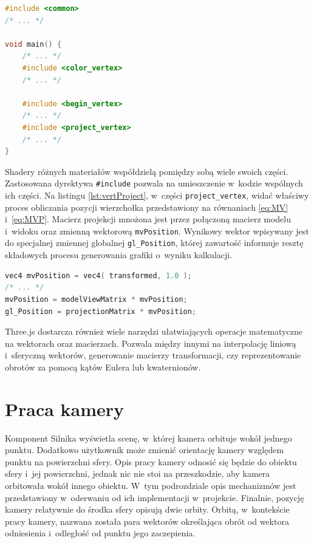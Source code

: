 \begin{lstlisting}[language=C++, label={lst:matVert}, caption={
    Fragmenty vertex shadera materiału \texttt{MeshBasicMaterial}}
]
#include <common>
/* ... */

void main() {
    /* ... */
	#include <color_vertex>
    /* ... */

	#include <begin_vertex>
	/* ... */
	#include <project_vertex>
	/* ... */
}
\end{lstlisting}

Shadery różnych materiałów współdzielą pomiędzy sobą wiele swoich części. Zastosowana dyrektywa \texttt{\#include} pozwala na umieszczenie w~kodzie wspólnych ich części. Na listingu \ref{lst:vertProject}, w~części \texttt{project\_vertex}, widać właściwy proces obliczania pozycji wierzchołka przedstawiony na równaniach \ref{eq:MV} i~\ref{eq:MVP}. Macierz projekcji mnożona jest przez połączoną macierz modelu i~widoku oraz zmienną wektorową \texttt{mvPosition}. Wynikowy wektor wpisywany jest do specjalnej zmiennej globalnej \texttt{gl\_Position}, której zawartość informuje resztę składowych procesu generowania grafiki o~wyniku kalkulacji. 

\begin{lstlisting}[language=C++, label={lst:vertProject}, caption={
    Fragmenty części \texttt{project\_vertex} vertex shadera}
]
vec4 mvPosition = vec4( transformed, 1.0 );
/* ... */
mvPosition = modelViewMatrix * mvPosition;
gl_Position = projectionMatrix * mvPosition;
\end{lstlisting}

Three.js dostarcza również wiele narzędzi ułatwiających operacje matematyczne na wektorach oraz macierzach. Pozwala między innymi na interpolację liniową i~sferyczną wektorów, generowanie macierzy transformacji, czy reprezentowanie obrotów za pomocą kątów Eulera lub kwaternionów.

\section{Praca kamery}
\label{sec:camera}

Komponent Silnika wyświetla scenę, w~której kamera orbituje wokół jednego punktu. Dodatkowo użytkownik może zmienić orientację kamery względem punktu na powierzchni sfery. Opis pracy kamery odnosić się będzie do obiektu sfery i~jej powierzchni, jednak nic nie stoi na przeszkodzie, aby kamera orbitowała wokół innego obiektu. W~tym podrozdziale opis mechanizmów jest przedstawiony w~oderwaniu od ich implementacji w~projekcie. Finalnie, pozycję kamery relatywnie do środka sfery opisują dwie orbity. Orbitą, w~kontekście pracy kamery, nazwana została para wektorów określająca obrót od wektora odniesienia i~odległość od punktu jego zaczepienia.


